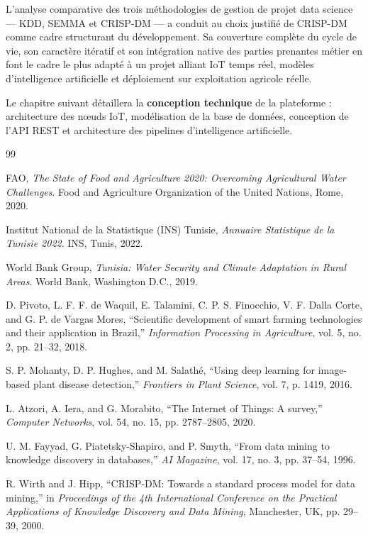 \documentclass[12pt, a4paper]{report}
\begin{document}
L'analyse comparative des trois méthodologies de gestion de projet data science — KDD, SEMMA et CRISP-DM — a conduit au choix justifié de CRISP-DM comme cadre structurant du développement. Sa couverture complète du cycle de vie, son caractère itératif et son intégration native des parties prenantes métier en font le cadre le plus adapté à un projet alliant IoT temps réel, modèles d'intelligence artificielle et déploiement sur exploitation agricole réelle.

Le chapitre suivant détaillera la \textbf{conception technique} de la plateforme : architecture des nœuds IoT, modélisation de la base de données, conception de l'API REST et architecture des pipelines d'intelligence artificielle.

\begin{thebibliography}{99}

FAO, \textit{The State of Food and Agriculture 2020: Overcoming Agricultural Water Challenges}.
Food and Agriculture Organization of the United Nations, Rome, 2020.

Institut National de la Statistique (INS) Tunisie,
\textit{Annuaire Statistique de la Tunisie 2022}.
INS, Tunis, 2022.

World Bank Group,
\textit{Tunisia: Water Security and Climate Adaptation in Rural Areas}.
World Bank, Washington D.C., 2019.

D. Pivoto, L. F. F. de Waquil, E. Talamini, C. P. S. Finocchio, V. F. Dalla Corte, and G. P. de Vargas Mores,
``Scientific development of smart farming technologies and their application in Brazil,''
\textit{Information Processing in Agriculture}, vol. 5, no. 2, pp. 21--32, 2018.

S. P. Mohanty, D. P. Hughes, and M. Salathé,
``Using deep learning for image-based plant disease detection,''
\textit{Frontiers in Plant Science}, vol. 7, p. 1419, 2016.

L. Atzori, A. Iera, and G. Morabito,
``The Internet of Things: A survey,''
\textit{Computer Networks}, vol. 54, no. 15, pp. 2787--2805, 2020.

U. M. Fayyad, G. Piatetsky-Shapiro, and P. Smyth,
``From data mining to knowledge discovery in databases,''
\textit{AI Magazine}, vol. 17, no. 3, pp. 37--54, 1996.

R. Wirth and J. Hipp,
``CRISP-DM: Towards a standard process model for data mining,''
in \textit{Proceedings of the 4th International Conference on the Practical Applications of Knowledge Discovery and Data Mining},
Manchester, UK, pp. 29--39, 2000.

\end{thebibliography}
\end{document}
